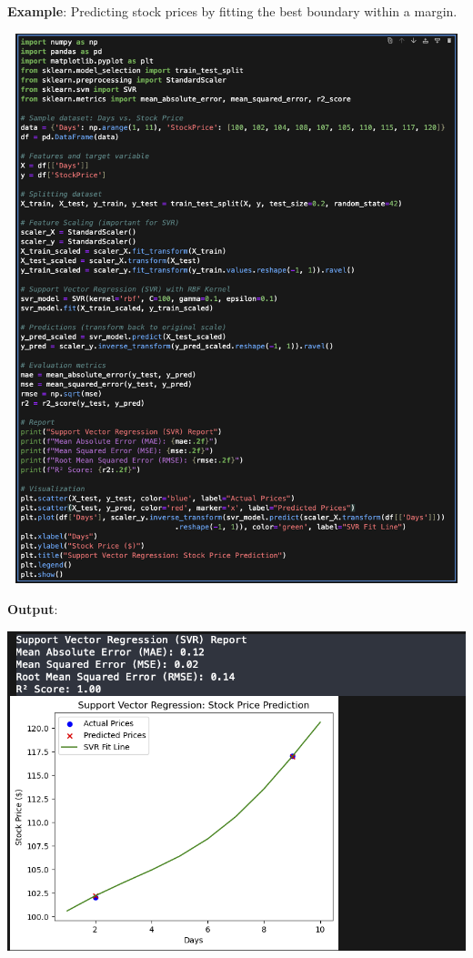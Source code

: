 \documentclass{article}
\begin{document}
\begin{itemize}
\begin{itemize}
    \textbf{Example}: Predicting stock prices by fitting the best boundary within a margin.

    \includegraphics[width=14cm,height=16cm]{SVR.png}

\newpage
\textbf{Output}:

\includegraphics[width=14cm,height=6
cm]{SVR_Output.png}
    \end{itemize}
\end{itemize}
\end{document}

